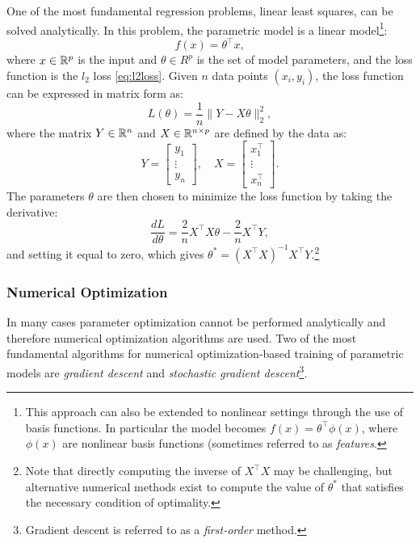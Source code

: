 \begin{example}
One of the most fundamental regression problems, linear least squares, can be solved analytically. In this problem, the parametric model is a linear model\footnote{This approach can also be extended to nonlinear settings through the use of basis functions. In particular the model becomes $f(x) = \theta^\top \phi(x)$, where $\phi(x)$ are nonlinear basis functions (sometimes referred to as \textit{features}.}:
\begin{equation*}
    f(x) = \theta^\top x,
\end{equation*}
where $x \in \mathbb{R}^p$ is the input and $\theta \in R^p$ is the set of model parameters, and the loss function is the $l_2$ loss \eqref{eq:l2loss}. Given $n$ data points $(x_i, y_i)$, the loss function can be expressed in matrix form as:
\begin{equation*}
L(\theta) = \frac{1}{n}\lVert Y - X\theta \rVert_2^2,
\end{equation*}
where the matrix $Y \in \mathbb{R}^n$ and $X \in \mathbb{R}^{n \times p}$ are defined by the data as:
\begin{equation*}
Y = \begin{bmatrix}
y_1 \\ \vdots \\ y_n
\end{bmatrix}, \quad X = 
\begin{bmatrix}
x_1^\top \\ \vdots \\ x^\top_n
\end{bmatrix}.
\end{equation*}
The parameters $\theta$ are then chosen to minimize the loss function by taking the derivative:
\begin{equation*}
\frac{dL}{d\theta} = \frac{2}{n}X^\top X\theta - \frac{2}{n}X^\top Y,
\end{equation*}
and setting it equal to zero, which gives $\theta^* = (X^\top X)^{-1}X^\top Y$.\footnote{Note that directly computing the inverse of $X^\top X$ may be challenging, but alternative numerical methods exist to compute the value of $\theta^*$ that satisfies the necessary condition of optimality.}
\end{example}


\subsubsection{Numerical Optimization} \label{subsubsec:MLnumopt}
In many cases parameter optimization cannot be performed analytically and therefore numerical optimization algorithms are used. Two of the most fundamental algorithms for numerical optimization-based training of parametric models are \textit{gradient descent} and \textit{stochastic gradient descent}\footnote{Gradient descent is referred to as a \textit{first-order} method.}. 

